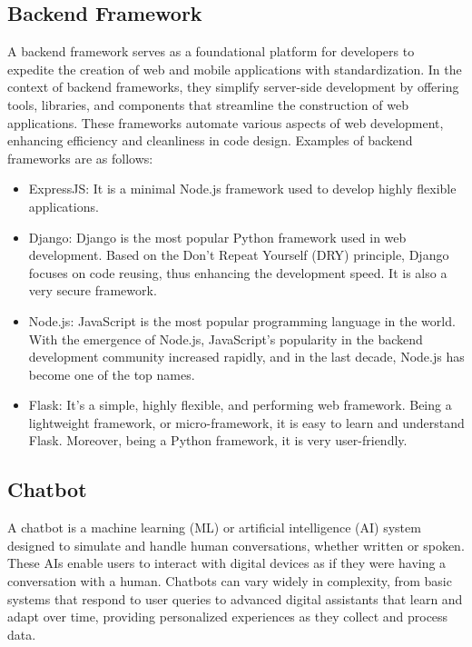\documentclass[12pt,oneside,openright,a4paper]{cpe-english-project}
\begin{document}
  \subsection{Backend Framework}
    \qquad A backend framework serves as a foundational platform for developers to expedite the creation of web and mobile applications with standardization. In the context of backend frameworks, they simplify server-side development by offering tools, libraries, and components that streamline the construction of web applications. These frameworks automate various aspects of web development, enhancing efficiency and cleanliness in code design. Examples of backend frameworks are as follows:\par
    \begin{itemize}
      \item ExpressJS: It is a minimal Node.js framework used to develop highly flexible applications.
      \item Django: Django is the most popular Python framework used in web development. Based on the Don’t Repeat Yourself (DRY) principle, Django focuses on code reusing, thus enhancing the development speed. It is also a very secure framework.
      \item Node.js: JavaScript is the most popular programming language in the world. With the emergence of Node.js, JavaScript’s popularity in the backend development community increased rapidly, and in the last decade, Node.js has become one of the top names.
      \item Flask: It’s a simple, highly flexible, and performing web framework. Being a lightweight framework, or micro-framework, it is easy to learn and understand Flask. Moreover, being a Python framework, it is very user-friendly.
    \end{itemize}
  
  \subsection{Chatbot}
    \qquad A chatbot is a machine learning (ML) or artificial intelligence (AI) system designed to simulate and handle human conversations, whether written or spoken. These AIs enable users to interact with digital devices as if they were having a conversation with a human. Chatbots can vary widely in complexity, from basic systems that respond to user queries to advanced digital assistants that learn and adapt over time, providing personalized experiences as they collect and process data.\par
\end{document}
